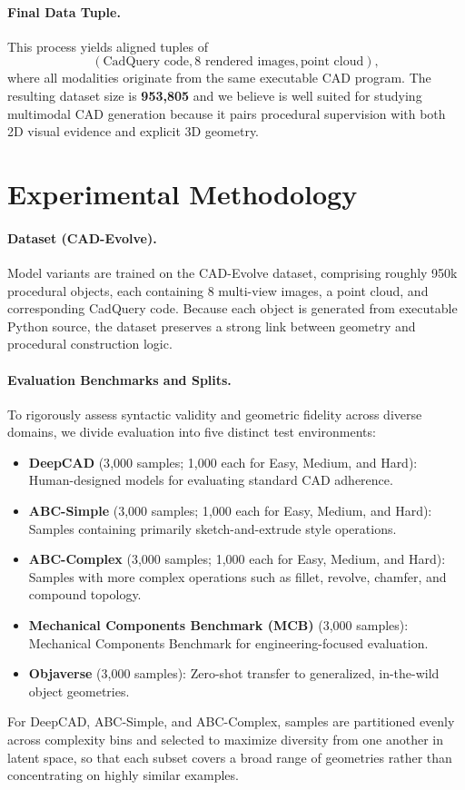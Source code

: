 \documentclass{article}
\begin{document}
\paragraph{Final Data Tuple.}
This process yields aligned tuples of
\[
(\text{CadQuery code}, \text{8 rendered images}, \text{point cloud}),
\]
where all modalities originate from the same executable CAD program. The resulting dataset size is \textbf{953,805} and we believe is well suited for studying multimodal CAD generation because it pairs procedural supervision with both 2D visual evidence and explicit 3D geometry.

\section{Experimental Methodology}

\paragraph{Dataset (CAD-Evolve).}
Model variants are trained on the CAD-Evolve dataset, comprising roughly 950k procedural objects, each containing 8 multi-view images, a point cloud, and corresponding CadQuery code. Because each object is generated from executable Python source, the dataset preserves a strong link between geometry and procedural construction logic.

\paragraph{Evaluation Benchmarks and Splits.}
To rigorously assess syntactic validity and geometric fidelity across diverse domains, we divide evaluation into five distinct test environments:
\begin{itemize}
    \item \textbf{DeepCAD} \cite{wu2021deepcad} (3{,}000 samples; 1{,}000 each for Easy, Medium, and Hard): Human-designed models for evaluating standard CAD adherence.
    \item \textbf{ABC-Simple} \cite{koch2019abc} (3{,}000 samples; 1{,}000 each for Easy, Medium, and Hard): Samples containing primarily sketch-and-extrude style operations.
    \item \textbf{ABC-Complex} \cite{koch2019abc} (3{,}000 samples; 1{,}000 each for Easy, Medium, and Hard): Samples with more complex operations such as fillet, revolve, chamfer, and compound topology.
    \item \textbf{Mechanical Components Benchmark (MCB)} \cite{sangpil2020large} (3{,}000 samples): Mechanical Components Benchmark for engineering-focused evaluation.
    \item \textbf{Objaverse} \cite{deitke2023objaverse} (3{,}000 samples): Zero-shot transfer to generalized, in-the-wild object geometries.
\end{itemize}
For DeepCAD, ABC-Simple, and ABC-Complex, samples are partitioned evenly across complexity bins and selected to maximize diversity from one another in latent space, so that each subset covers a broad range of geometries rather than concentrating on highly similar examples.
\end{document}
